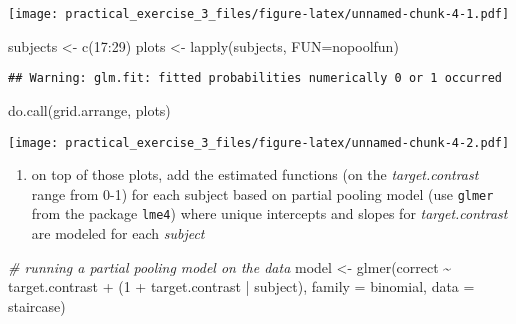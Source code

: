 \documentclass[
]{article}
\newenvironment{Shaded}{\begin{snugshade}}{\end{snugshade}}
\newcommand{\AttributeTok}[1]{\textcolor[rgb]{0.77,0.63,0.00}{#1}}
\newcommand{\CommentTok}[1]{\textcolor[rgb]{0.56,0.35,0.01}{\textit{#1}}}
\newcommand{\DecValTok}[1]{\textcolor[rgb]{0.00,0.00,0.81}{#1}}
\newcommand{\FunctionTok}[1]{\textcolor[rgb]{0.00,0.00,0.00}{#1}}
\newcommand{\NormalTok}[1]{#1}
\newcommand{\OtherTok}[1]{\textcolor[rgb]{0.56,0.35,0.01}{#1}}
\newcommand{\SpecialCharTok}[1]{\textcolor[rgb]{0.00,0.00,0.00}{#1}}
\newcommand{\StringTok}[1]{\textcolor[rgb]{0.31,0.60,0.02}{#1}}
\providecommand{\tightlist}{%
  \setlength{\itemsep}{0pt}\setlength{\parskip}{0pt}}
\begin{document}
\texttt{[image: practical\_exercise\_3\_files/figure-latex/unnamed-chunk-4-1.pdf]}

\begin{Shaded}
\begin{Highlighting}[]
\NormalTok{subjects }\OtherTok{\textless{}{-}} \FunctionTok{c}\NormalTok{(}\DecValTok{17}\SpecialCharTok{:}\DecValTok{29}\NormalTok{)}
\NormalTok{plots }\OtherTok{\textless{}{-}} \FunctionTok{lapply}\NormalTok{(subjects, }\AttributeTok{FUN=}\NormalTok{nopoolfun)}
\end{Highlighting}
\end{Shaded}

\begin{verbatim}
## Warning: glm.fit: fitted probabilities numerically 0 or 1 occurred
\end{verbatim}

\begin{Shaded}
\begin{Highlighting}[]
\FunctionTok{do.call}\NormalTok{(grid.arrange,  plots)}
\end{Highlighting}
\end{Shaded}

\texttt{[image: practical\_exercise\_3\_files/figure-latex/unnamed-chunk-4-2.pdf]}

\begin{enumerate}
\def\labelenumi{\roman{enumi}.}
\setcounter{enumi}{3}
\tightlist
\item
  on top of those plots, add the estimated functions (on the
  \emph{target.contrast} range from 0-1) for each subject based on
  partial pooling model (use \texttt{glmer} from the package
  \texttt{lme4}) where unique intercepts and slopes for
  \emph{target.contrast} are modeled for each \emph{subject}
\end{enumerate}

\begin{Shaded}
\begin{Highlighting}[]
\CommentTok{\# running a partial pooling model on the data}
\NormalTok{model }\OtherTok{\textless{}{-}} \FunctionTok{glmer}\NormalTok{(correct }\SpecialCharTok{\textasciitilde{}}\NormalTok{ target.contrast }\SpecialCharTok{+}\NormalTok{ (}\DecValTok{1} \SpecialCharTok{+}\NormalTok{ target.contrast }\SpecialCharTok{|}\NormalTok{ subject), }\AttributeTok{family =} \StringTok{\textquotesingle{}binomial\textquotesingle{}}\NormalTok{, }\AttributeTok{data =}\NormalTok{ staircase)}
\end{Highlighting}
\end{Shaded}
\end{document}
